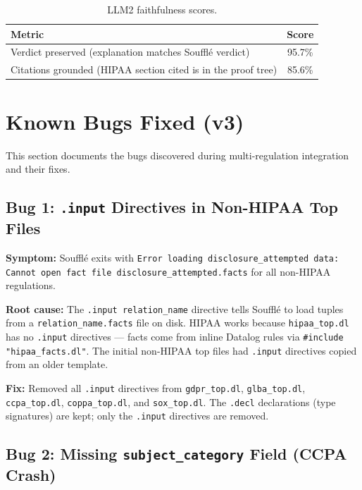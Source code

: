 \documentclass[11pt,letterpaper]{article}
\begin{document}
\begin{appendices}
\begin{table}[H]
\centering
\begin{tabular}{lc}
\toprule
\textbf{Metric} & \textbf{Score} \\
\midrule
Verdict preserved (explanation matches Souffl\'{e} verdict) & 95.7\% \\
Citations grounded (HIPAA section cited is in the proof tree) & 85.6\% \\
\bottomrule
\end{tabular}
\caption{LLM2 faithfulness scores.}
\end{table}


\section{Known Bugs Fixed (v3)}
\label{sec:bugs-fixed}

This section documents the bugs discovered during multi-regulation integration and their fixes.

\subsection{Bug 1: \texttt{.input} Directives in Non-HIPAA Top Files}

\textbf{Symptom:} Souffl\'{e} exits with \texttt{Error loading disclosure\_attempted data: Cannot open fact file disclosure\_attempted.facts} for all non-HIPAA regulations.

\textbf{Root cause:} The \texttt{.input relation\_name} directive tells Souffl\'{e} to load tuples from a \texttt{relation\_name.facts} file on disk. HIPAA works because \texttt{hipaa\_top.dl} has no \texttt{.input} directives --- facts come from inline Datalog rules via \texttt{\#include "hipaa\_facts.dl"}. The initial non-HIPAA top files had \texttt{.input} directives copied from an older template.

\textbf{Fix:} Removed all \texttt{.input} directives from \texttt{gdpr\_top.dl}, \texttt{glba\_top.dl}, \texttt{ccpa\_top.dl}, \texttt{coppa\_top.dl}, and \texttt{sox\_top.dl}. The \texttt{.decl} declarations (type signatures) are kept; only the \texttt{.input} directives are removed.

\subsection{Bug 2: Missing \texttt{subject\_category} Field (CCPA Crash)}


\end{appendices}
\end{document}
